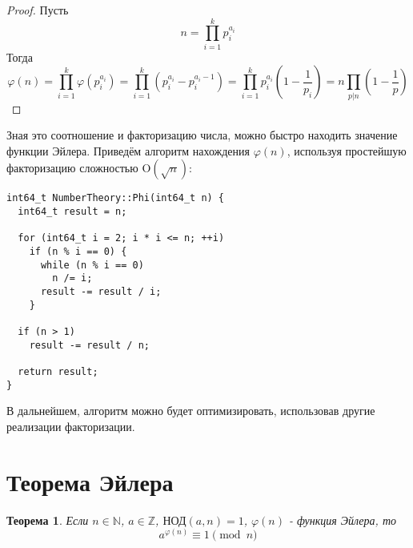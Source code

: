 \documentclass[12pt, a4paper, openany]{book}
\newtheorem*{theorem}{Теорема}
\begin{document}
\begin{proof}
    Пусть \[
    n = \prod_{i = 1}^k p_{i}^{a_{i}}
    \]
    Тогда \[
    \varphi(n) = \prod_{i = 1}^k \varphi(p_{i}^{a_{i}}) = 
    \prod_{i = 1}^k (p_{i}^{a_{i}} - p_{i}^{a_{i} - 1}) =
    \prod_{i = 1}^k p_{i}^{a_{i}} \left(1 - \frac{1}{p_{i}}\right) = 
    n \prod_{p|n} \left(1 - \frac{1}{p}\right)
    \]
\end{proof}

    Зная это соотношение и факторизацию числа, можно быстро находить значение функции Эйлера. Приведём алгоритм нахождения $\varphi(n)$, используя простейшую факторизацию сложностью $\text{O}(\sqrt{n})$: 
    
\begin{lstlisting}
int64_t NumberTheory::Phi(int64_t n) {
  int64_t result = n;

  for (int64_t i = 2; i * i <= n; ++i)
    if (n % i == 0) {
      while (n % i == 0)
        n /= i;
      result -= result / i;
    }

  if (n > 1)
    result -= result / n;

  return result;
}
\end{lstlisting}

    В дальнейшем, алгоритм можно будет оптимизировать, использовав другие реализации факторизации.

\newpage
\section{Теорема Эйлера}
\begin{theorem}
    Если $n \in \mathbb{N}$, $a \in \mathbb{Z}$, $\text{НОД}(a, n) = 1$, $\varphi(n)$ - функция Эйлера, то
    \[
    a^{\varphi(n)} \equiv 1 \pmod{n}
    \]
\end{theorem}
\end{document}
